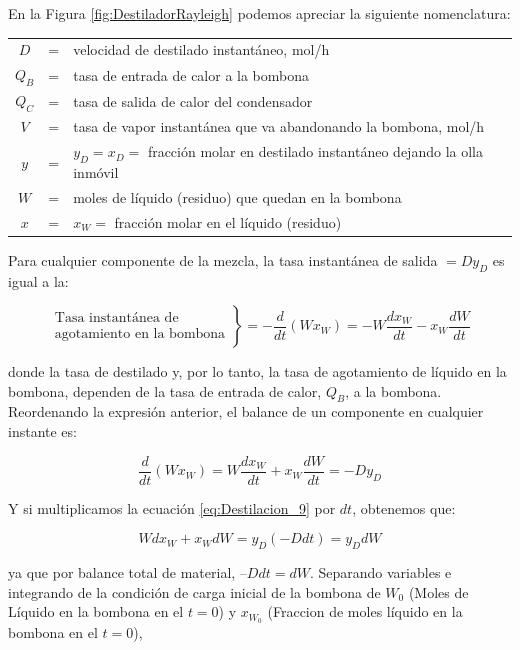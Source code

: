 \documentclass[11pt]{book}
\begin{document}
En la Figura \ref{fig:DestiladorRayleigh} podemos apreciar la siguiente nomenclatura:

\hspace{0.1cm}

\begin{tabular}{c c l}
     $D$ &=&  velocidad de destilado instantáneo, mol/h \\
    $Q_B$ &=&  tasa de entrada de calor a la bombona \\
    $Q_C$ &=&  tasa de salida de calor del condensador \\
    $V$ &=& tasa de vapor instantánea que va abandonando la bombona, mol/h \\ 
    $y$ &=& $y_D = x_D =$ fracción molar en destilado instantáneo dejando la olla inmóvil \\
    $W$ &=& moles de líquido (residuo) que quedan en la bombona \\
    $x$ &=& $x_W =$ fracción molar en el líquido (residuo)
\end{tabular}

Para cualquier componente de la mezcla, la tasa instantánea de salida $= D y_D$ es igual a la:

\begin{equation}
    \left. \begin{matrix}
        \textrm{Tasa instantánea de} \\
        \textrm{agotamiento en la bombona}
    \end{matrix} \right\}
     = - \frac{d}{dt} \left( W x_W \right) = -W \frac{dx_W}{dt} - x_W \frac{dW}{dt} 
\end{equation}

donde la tasa de destilado y, por lo tanto, la tasa de agotamiento de líquido en la bombona, dependen de la tasa de entrada de calor, $Q_B$, a la bombona. Reordenando la expresión anterior, el balance de un componente en cualquier instante es:

\begin{equation}
    \label{eq:Destilacion_9}
    \frac{d}{dt}(W x_W) = W \frac{dx_W}{dt} + x_W\frac{dW}{dt} = - Dy_D
\end{equation}

Y si multiplicamos la ecuación \ref{eq:Destilacion_9} por $dt$, obtenemos que:

\begin{equation*}
    W dx_W + x_WdW = y_D (- D dt) = y_D dW
\end{equation*}

ya que por balance total de material, $–Ddt = dW$. Separando variables e integrando de la condición de carga inicial de la bombona de $W_0$ (Moles de
Líquido en la bombona en el $t = 0$) y $x_{W_0}$ (Fraccion de moles líquido en la bombona en el $t = 0$),
\end{document}
